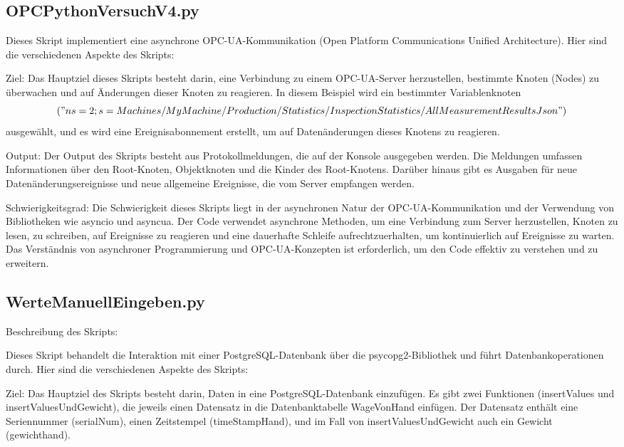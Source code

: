 \subsection{OPCPythonVersuchV4.py}

Dieses Skript implementiert eine asynchrone OPC-UA-Kommunikation (Open Platform Communications Unified Architecture). Hier sind die verschiedenen Aspekte des Skripts:

Ziel:
Das Hauptziel dieses Skripts besteht darin, eine Verbindung zu einem OPC-UA-Server herzustellen, bestimmte Knoten (Nodes) zu überwachen und auf Änderungen dieser Knoten zu reagieren. In diesem Beispiel wird ein bestimmter Variablenknoten $$("ns=2;s=Machines/MyMachine/Production/Statistics/InspectionStatistics/AllMeasurementResultsJson")$$ ausgewählt, und es wird eine Ereignisabonnement erstellt, um auf Datenänderungen dieses Knotens zu reagieren.

Output:
Der Output des Skripts besteht aus Protokollmeldungen, die auf der Konsole ausgegeben werden. Die Meldungen umfassen Informationen über den Root-Knoten, Objektknoten und die Kinder des Root-Knotens. Darüber hinaus gibt es Ausgaben für neue Datenänderungsereignisse und neue allgemeine Ereignisse, die vom Server empfangen werden.

Schwierigkeitsgrad:
Die Schwierigkeit dieses Skripts liegt in der asynchronen Natur der OPC-UA-Kommunikation und der Verwendung von Bibliotheken wie asyncio und asyncua. Der Code verwendet asynchrone Methoden, um eine Verbindung zum Server herzustellen, Knoten zu lesen, zu schreiben, auf Ereignisse zu reagieren und eine dauerhafte Schleife aufrechtzuerhalten, um kontinuierlich auf Ereignisse zu warten. Das Verständnis von asynchroner Programmierung und OPC-UA-Konzepten ist erforderlich, um den Code effektiv zu verstehen und zu erweitern.

\subsection{WerteManuellEingeben.py}

Beschreibung des Skripts:

Dieses Skript behandelt die Interaktion mit einer PostgreSQL-Datenbank über die psycopg2-Bibliothek und führt Datenbankoperationen durch. Hier sind die verschiedenen Aspekte des Skripts:

Ziel:
Das Hauptziel des Skripts besteht darin, Daten in eine PostgreSQL-Datenbank einzufügen. Es gibt zwei Funktionen (insertValues und insertValuesUndGewicht), die jeweils einen Datensatz in die Datenbanktabelle WageVonHand einfügen. Der Datensatz enthält eine Seriennummer (serialNum), einen Zeitstempel (timeStampHand), und im Fall von insertValuesUndGewicht auch ein Gewicht (gewichthand).

